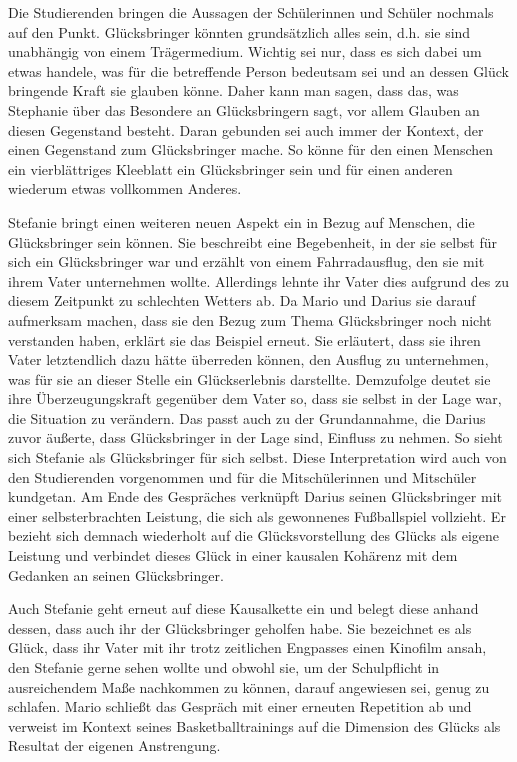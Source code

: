 Die Studierenden bringen die Aussagen der Schülerinnen und Schüler nochmals auf den Punkt. 
Glücksbringer könnten grundsätzlich alles sein, d.h. sie sind unabhängig von einem Trägermedium. 
Wichtig sei nur, dass es sich dabei um etwas handele, was für die betreffende Person bedeutsam sei und an dessen Glück bringende Kraft sie glauben könne. 
Daher kann man sagen, dass das, was Stephanie über das Besondere an Glücksbringern sagt, vor allem Glauben an diesen Gegenstand besteht.
Daran gebunden sei auch immer der Kontext, der einen Gegenstand zum Glücksbringer mache. 
So könne für den einen Menschen ein vierblättriges Kleeblatt ein Glücksbringer sein und für einen anderen wiederum etwas vollkommen Anderes.

Stefanie bringt einen weiteren neuen Aspekt ein in Bezug auf Menschen, die Glücksbringer sein können. 
Sie beschreibt eine Begebenheit, in der sie selbst für sich ein Glücksbringer war und erzählt von einem Fahrradausflug, den sie mit ihrem Vater unternehmen wollte.
Allerdings lehnte ihr Vater dies aufgrund des zu diesem Zeitpunkt zu schlechten Wetters ab. 
Da Mario und Darius sie darauf aufmerksam machen, dass sie den Bezug zum Thema \glqq Glücksbringer\grqq{} noch nicht verstanden haben, erklärt sie das Beispiel erneut. 
Sie erläutert, dass sie ihren Vater letztendlich dazu hätte überreden können, den Ausflug zu unternehmen, was für sie an dieser Stelle ein Glückserlebnis darstellte. 
Demzufolge deutet sie ihre Überzeugungskraft gegenüber dem Vater so, dass sie selbst in der Lage war, die Situation zu verändern. 
Das passt auch zu der Grundannahme, die Darius zuvor äußerte, dass Glücksbringer in der Lage sind, Einfluss zu nehmen. 
So sieht sich Stefanie als Glücksbringer für sich selbst. 
Diese Interpretation wird auch von den Studierenden vorgenommen und für die Mitschülerinnen und Mitschüler kundgetan.
Am Ende des Gespräches verknüpft Darius seinen Glücksbringer mit einer selbsterbrachten Leistung, die sich als gewonnenes Fußballspiel vollzieht. 
Er bezieht sich demnach wiederholt auf die Glücksvorstellung des Glücks als eigene Leistung und verbindet dieses Glück in einer kausalen Kohärenz mit dem Gedanken an seinen Glücksbringer.

Auch Stefanie geht erneut auf diese Kausalkette ein und belegt diese anhand dessen, dass auch ihr der Glücksbringer geholfen habe. 
Sie bezeichnet es als Glück, dass ihr Vater mit ihr trotz zeitlichen Engpasses einen Kinofilm ansah, den Stefanie gerne sehen wollte und obwohl sie, um der Schulpflicht in ausreichendem Maße nachkommen zu können, darauf angewiesen sei, genug zu schlafen. Mario schließt das Gespräch mit einer erneuten Repetition ab und verweist im Kontext seines Basketballtrainings auf die Dimension des Glücks als Resultat der eigenen Anstrengung.

